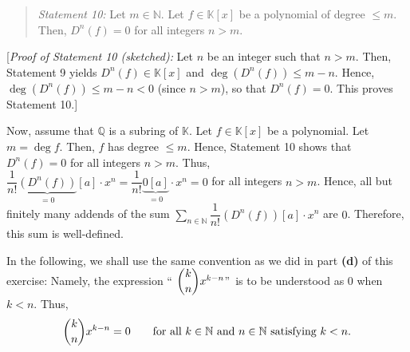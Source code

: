 \documentclass[paper=a4, fontsize=12pt]{scrartcl}%
\let\sumnonlimits\sum
\renewcommand{\sum}{\sumnonlimits\limits}
\theoremstyle{plainsl}
\theoremstyle{definition}
\theoremstyle{remark}
\newenvironment{statement}{\begin{quote}}{\end{quote}}
\begin{document}
\begin{statement}
\textit{Statement 10:} Let $m\in\mathbb{N}$. Let $f\in\mathbb{K}\left[
x\right]  $ be a polynomial of degree $\leq m$. Then, $D^{n}\left(  f\right)
=0$ for all integers $n>m$.
\end{statement}

[\textit{Proof of Statement 10 (sketched):} Let $n$ be an integer such that
$n>m$. Then, Statement 9 yields $D^{n}\left(  f\right)  \in\mathbb{K}\left[
x\right]  $ and $\deg\left(  D^{n}\left(  f\right)  \right)  \leq m-n$. Hence,
$\deg\left(  D^{n}\left(  f\right)  \right)  \leq m-n<0$ (since $n>m$), so
that $D^{n}\left(  f\right)  =0$. This proves Statement 10.]

Now, assume that $\mathbb{Q}$ is a subring of $\mathbb{K}$. Let $f\in
\mathbb{K}\left[  x\right]  $ be a polynomial. Let $m=\deg f$. Then, $f$ has
degree $\leq m$. Hence, Statement 10 shows that $D^{n}\left(  f\right)  =0$
for all integers $n>m$. Thus, $\dfrac{1}{n!}\underbrace{\left(  D^{n}\left(
f\right)  \right)  }_{=0}\left[  a\right]  \cdot x^{n}=\dfrac{1}%
{n!}\underbrace{0\left[  a\right]  }_{=0}\cdot x^{n}=0$ for all integers
$n>m$. Hence, all but finitely many addends of the sum $\sum_{n\in\mathbb{N}%
}\dfrac{1}{n!}\left(  D^{n}\left(  f\right)  \right)  \left[  a\right]  \cdot
x^{n}$ are $0$. Therefore, this sum is well-defined.

In the following, we shall use the same convention as we did in part
\textbf{(d)} of this exercise: Namely, the expression \textquotedblleft%
$\dbinom{k}{n}x^{k-n}$\textquotedblright\ is to be understood as $0$ when
$k<n$. Thus,%
\begin{equation}
\dbinom{k}{n}x^{k-n}=0\qquad\text{for all }k\in\mathbb{N}\text{ and }%
n\in\mathbb{N}\text{ satisfying }k<n. \label{sol.pol.diff1.e.pf.conv}%
\end{equation}
\end{document}
